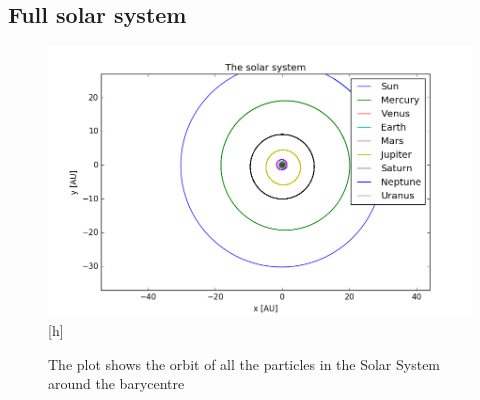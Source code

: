 \subsection{Full solar system}
\begin{figure}[H]
\includegraphics[width=\textwidth]{figures/solarsystem}[h]
\caption{The plot shows the orbit of all the particles in the Solar System around the barycentre}
\end{figure}

